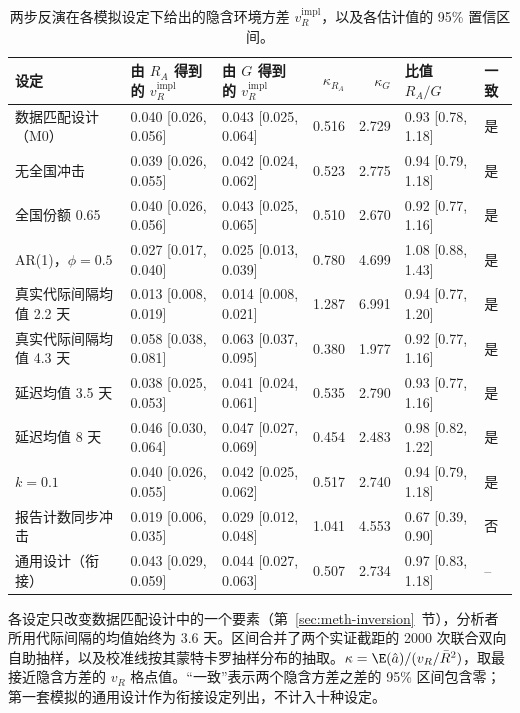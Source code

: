 \begin{table}[htbp]
\centering
\footnotesize
\setlength{\tabcolsep}{4pt}
\caption{两步反演在各模拟设定下给出的隐含环境方差 $v_R^{\mathrm{impl}}$，以及各估计值的 95\% 置信区间。}
\label{tab:s8}
\begin{tabular}{lllrrll}
\toprule
设定 & 由 $R_A$ 得到的 $v_R^{\mathrm{impl}}$ & 由 $G$ 得到的 $v_R^{\mathrm{impl}}$ & $\kappa_{R_A}$ & $\kappa_G$ & 比值 $R_A/G$ & 一致 \\
\midrule
数据匹配设计（M0） & 0.040 [0.026, 0.056] & 0.043 [0.025, 0.064] & 0.516 & 2.729 & 0.93 [0.78, 1.18] & 是 \\
无全国冲击 & 0.039 [0.026, 0.055] & 0.042 [0.024, 0.062] & 0.523 & 2.775 & 0.94 [0.79, 1.18] & 是 \\
全国份额 0.65 & 0.040 [0.026, 0.056] & 0.043 [0.025, 0.065] & 0.510 & 2.670 & 0.92 [0.77, 1.16] & 是 \\
AR(1)，$\phi=0.5$ & 0.027 [0.017, 0.040] & 0.025 [0.013, 0.039] & 0.780 & 4.699 & 1.08 [0.88, 1.43] & 是 \\
真实代际间隔均值 2.2 天 & 0.013 [0.008, 0.019] & 0.014 [0.008, 0.021] & 1.287 & 6.991 & 0.94 [0.77, 1.20] & 是 \\
真实代际间隔均值 4.3 天 & 0.058 [0.038, 0.081] & 0.063 [0.037, 0.095] & 0.380 & 1.977 & 0.92 [0.77, 1.16] & 是 \\
延迟均值 3.5 天 & 0.038 [0.025, 0.053] & 0.041 [0.024, 0.061] & 0.535 & 2.790 & 0.93 [0.77, 1.16] & 是 \\
延迟均值 8 天 & 0.046 [0.030, 0.064] & 0.047 [0.027, 0.069] & 0.454 & 2.483 & 0.98 [0.82, 1.22] & 是 \\
$k=0.1$ & 0.040 [0.026, 0.055] & 0.042 [0.025, 0.062] & 0.517 & 2.740 & 0.94 [0.79, 1.18] & 是 \\
报告计数同步冲击 & 0.019 [0.006, 0.035] & 0.029 [0.012, 0.048] & 1.041 & 4.553 & 0.67 [0.39, 0.90] & 否 \\
通用设计（衔接） & 0.043 [0.029, 0.059] & 0.044 [0.027, 0.063] & 0.507 & 2.734 & 0.97 [0.83, 1.18] & -- \\
\bottomrule
\end{tabular}
\par\smallskip
\begin{minipage}{0.95\linewidth}\scriptsize 各设定只改变数据匹配设计中的一个要素（第~\ref{sec:meth-inversion}~节），分析者所用代际间隔的均值始终为 3.6 天。区间合并了两个实证截距的 2000 次联合双向自助抽样，以及校准线按其蒙特卡罗抽样分布的抽取。$\kappa=\E(\hat{a})/(v_R/\bar{R}^2)$，取最接近隐含方差的 $v_R$ 格点值。“一致”表示两个隐含方差之差的 95\% 区间包含零；第一套模拟的通用设计作为衔接设定列出，不计入十种设定。\end{minipage}
\end{table}
